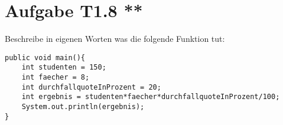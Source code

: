 \documentclass[final,a4paper]{article}
\begin{document}
\section*{Aufgabe T1.8 **}
Beschreibe in eigenen Worten was die folgende Funktion tut:
\begin{lstlisting}
public void main(){
	int studenten = 150;
	int faecher = 8;
	int durchfallquoteInProzent = 20;
	int ergebnis = studenten*faecher*durchfallquoteInProzent/100;
	System.out.println(ergebnis);
}
\end{lstlisting}
\end{document}
